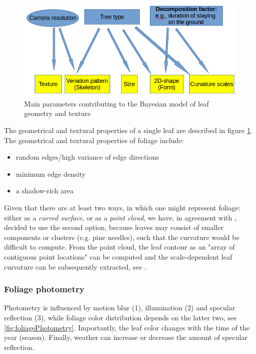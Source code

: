 \documentclass[fleqn,10pt]{SelfArx} %
\begin{document}
\begin{figure}[ht]\centering
\includegraphics[width=\linewidth]{Figures/leafGeom.png}
\caption{Main parameters contributing to the Bayesian model of leaf geometry and texture}
\label{fig:leafGeom}
\end{figure}

The geometrical and textural properties of a single leaf are described in figure \ref{fig:leafGeom}. The geometrical and textural properties of foliage include:

\begin{itemize}[nolistsep]
 \item random edges/high variance of edge directions
 \item minimum edge density
 \item a shadow-rich area
\end{itemize}

Given that there are at least two ways, in which one might represent foliage: either as a \emph{curved surface}, or as a \emph{point cloud}, we have, in agreement with \cite{Kumar:2012},  decided to use the second option, because leaves may consist of smaller components or clusters (e.g. pine needles), such that the curvature would be difficult to compute. From the point cloud, the leaf contour as an "array of contiguous point locations" can be computed and the scale-dependent leaf curvature can be subsequently extracted, see \cite{Kumar:2012}.

\subsubsection{Foliage photometry}

Photometry is influenced by motion blur (1), illumination (2) and specular reflection (3), while foliage color distribution depends on the latter two,  see \ref{fig:foliagePhotometry}. Importantly, the leaf color changes with the time of the year (season). Finally, weather can increase or decrease the amount of specular reflection.
\end{document}
